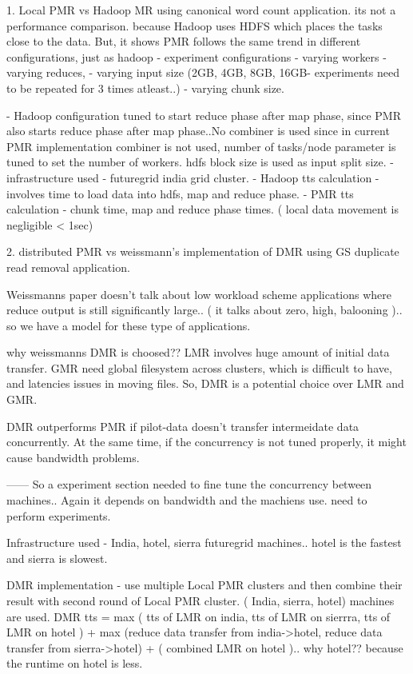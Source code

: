 \documentclass{acm_proc_article-sp}
\begin{document}
1. Local PMR vs Hadoop MR using canonical word count application.
 its not a performance comparison. because Hadoop uses HDFS which places the tasks close to the data. But, it shows PMR follows the same trend in different configurations, just as hadoop
     - experiment configurations
         - varying workers
         - varying reduces,
         - varying input size (2GB, 4GB, 8GB, 16GB- experiments need to be repeated for 3 times atleast..)
         - varying chunk size.

     - Hadoop configuration tuned to start reduce phase after map phase, since PMR also starts reduce phase after map phase..No combiner is used since in current PMR implementation combiner is not used, number of tasks/node parameter is tuned to set the number of workers. hdfs block size is used as input split size. 
     - infrastructure used - futuregrid india grid cluster.
     - Hadoop tts calculation -involves time to load data into hdfs, map and reduce phase.
     - PMR tts calculation - chunk time, map and reduce phase times. ( local data movement is negligible < 1sec)

2. distributed PMR vs weissmann's implementation of  DMR using GS duplicate read removal application.

Weissmanns paper doesn't talk about low workload scheme applications where reduce output is still significantly large.. ( it talks about zero, high, balooning ).. so we have a model for these type of applications.

why weissmanns DMR is choosed?? LMR involves huge amount of initial data transfer. GMR need global filesystem across clusters, which is difficult to have, and latencies issues in moving files. So, DMR is a potential choice over LMR and GMR. 

DMR outperforms PMR if pilot-data doesn't transfer intermeidate data concurrently. At the same time, if the concurrency  is not tuned properly, it might cause bandwidth problems.

------ So a experiment section needed to fine tune the concurrency between machines.. Again it depends on bandwidth and the machiens use. need to perform experiments.

Infrastructure used - India, hotel, sierra futuregrid machines.. hotel is the fastest and sierra is slowest.

DMR implementation - use multiple Local PMR clusters and then combine their result with second round of Local PMR cluster. ( India, sierra, hotel) machines are used.
DMR tts = max ( tts of LMR on india, tts of LMR  on sierrra, tts of LMR  on hotel ) + max (reduce data transfer from india->hotel, reduce data transfer from sierra->hotel) + ( combined LMR on hotel ).. why hotel?? because the runtime on hotel is less.  
\end{document}
